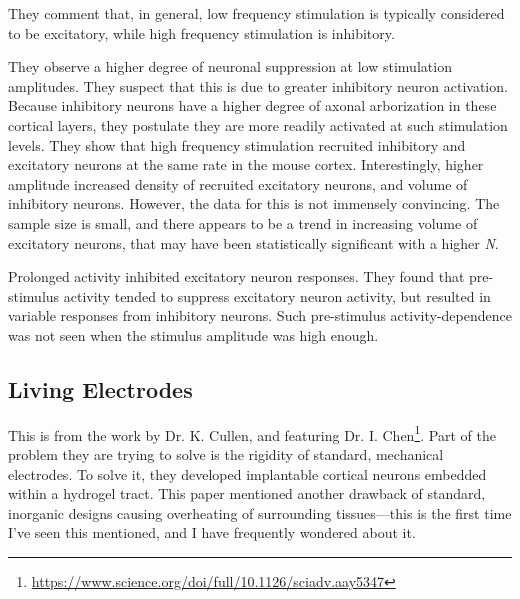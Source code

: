     They comment that, in general, low frequency stimulation is typically considered to be excitatory, while high frequency stimulation is inhibitory.\newline
    
    They observe a higher degree of neuronal suppression at low stimulation amplitudes. They suspect that this is due to greater inhibitory neuron activation. Because inhibitory neurons have a higher degree of axonal arborization in these cortical layers, they postulate they are more readily activated at such stimulation levels. They show that high frequency stimulation recruited inhibitory and excitatory neurons at the same rate in the mouse cortex. Interestingly, higher amplitude increased density of recruited excitatory neurons, and volume of inhibitory neurons. However, the data for this is not immensely convincing. The sample size is small, and there appears to be a trend in increasing volume of excitatory neurons, that may have been statistically significant with a higher \textit{N}.\newline
    
    Prolonged activity inhibited excitatory neuron responses. They found that pre-stimulus activity tended to suppress excitatory neuron activity, but resulted in variable responses from inhibitory neurons. Such pre-stimulus activity-dependence was not seen when the stimulus amplitude was high enough.\newline
     
    


\subsection{Living Electrodes}

This is from the work by Dr. K. Cullen, and featuring Dr. I. Chen\footnote{\url{https://www.science.org/doi/full/10.1126/sciadv.aay5347}}. Part of the problem they are trying to solve is the rigidity of standard, mechanical electrodes. To solve it, they developed implantable cortical neurons embedded within a hydrogel tract. This paper mentioned another drawback of standard, inorganic designs causing overheating of surrounding tissues---this is the first time I've seen this mentioned, and I have frequently wondered about it.\newline

